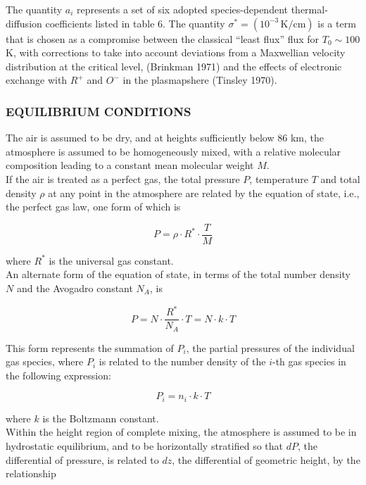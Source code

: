 \documentclass{article}
\begin{document}
The quantity $a_i$ represents a set of six adopted species-dependent thermal-diffusion coefficients listed in table 6. The quantity $\sigma^* = (10^{-3}\, \mathrm{K/cm})$ is a term that is chosen as a compromise between the classical “least flux” flux for $T_{0} \sim 100$ K, with corrections to take into account deviations from a Maxwellian velocity distribution at the critical level, (Brinkman 1971) and the effects of electronic exchange with $R^+$ and $O^-$ in the plasmapshere (Tinsley 1970).

\subsubsection{EQUILIBRIUM CONDITIONS} 
The air is assumed to be dry, and at heights sufficiently below 86 km, the atmosphere is assumed to be homogeneously mixed, with a relative molecular composition leading to a constant mean molecular weight $M$. \\
If the air is treated as a perfect gas, the total pressure $P$, temperature $T$ and total density $\rho$ at any point in the atmosphere are related by the equation of state, i.e., the perfect gas law, one form of which is

\begin{equation}
    P = \rho \cdot R^* \cdot \frac{T}{M} \tag{1}
\end{equation}

where $R^*$ is the universal gas constant. \\
An alternate form of the equation of state, in terms of the total number density $N$ and the Avogadro constant $N_A$, is

\begin{equation}
    P = N \cdot \frac{R^*}{N_A} \cdot T = N \cdot k \cdot T \tag{2}
\end{equation}

This form represents the summation of $P_i$, the partial pressures of the individual gas species, where $P_i$ is related to the number density of the $i$-th gas species in the following expression:

\begin{equation}
    P_i = n_i \cdot k \cdot T \tag{3}
\end{equation}

where $k$ is the Boltzmann constant. \\

Within the height region of complete mixing, the atmosphere is assumed to be in hydrostatic equilibrium, and to be horizontally stratified so that $dP$, the differential of pressure, is related to $dz$, the differential of geometric height, by the relationship
\end{document}

